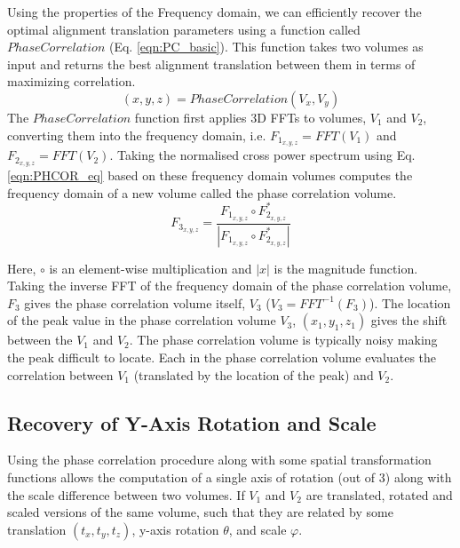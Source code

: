 Using the properties of the Frequency domain, we can efficiently recover the optimal alignment translation parameters using a function called $PhaseCorrelation$ (Eq. \ref{eqn:PC_basic}). This function takes two volumes as input and returns the best alignment translation between them in terms of maximizing correlation.
\begin{equation} \label{eqn:PC_basic}
(x, y, z) = PhaseCorrelation(V_x, V_y)
\end{equation}
The $PhaseCorrelation$ function first applies 3D FFTs to volumes, $V_1$ and $V_2$, converting them into the frequency domain, i.e. $F_{1_{x,y,z}} = FFT(V_1)$ and $F_{2_{x,y,z}} = FFT(V_2)$. Taking the normalised cross power spectrum using Eq. \ref{eqn:PHCOR_eq} based on these frequency domain volumes computes the frequency domain of a new volume called the phase correlation volume. \\


\begin{equation} \label{eqn:PHCOR_eq}
F_{3_{x,y,z}} = \frac{F_{1_{x,y,z}} \circ F_{2_{x,y,z}}^*}{ | F_{1_{x,y,z}} \circ F_{2_{x,y,z}}^* | }
\end{equation}

Here, $\circ$ is an element-wise multiplication and $|x|$ is the magnitude function. Taking the inverse FFT of the frequency domain of the phase correlation volume, $F_3$ gives the phase correlation volume itself, $V_3$ ($V_3 = FFT^{-1}(F_3)$). The location of the peak value in the phase correlation volume $V_3$, $(x_1, y_1, z_1)$ gives the shift between the $V_1$ and $V_2$. The phase correlation volume is typically noisy making the peak difficult to locate. Each in the phase correlation volume evaluates the correlation between $V_1$ (translated by the location of the peak) and $V_2$.


\subsection{Recovery of Y-Axis Rotation and Scale}

Using the phase correlation procedure along with some spatial transformation functions allows the computation of a single axis of rotation (out of 3) along with the scale difference between two volumes. If $V_1$ and $V_2$ are translated, rotated and scaled versions of the same volume, such that they are related by some translation $(t_x, t_y, t_z)$, y-axis rotation $\theta$, and scale $\varphi$.\\


